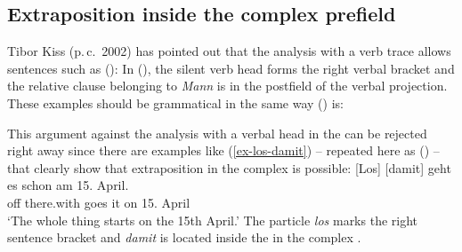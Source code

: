\subsection{Extraposition inside the complex prefield}
\label{sec-extraposition}

Tibor Kiss (p.\,c.\ 2002) has pointed out that the analysis with a verb trace allows sentences such as ():
\z
In (), the silent verb head forms the right verbal bracket and the relative clause belonging to \emph{Mann}
is in the postfield of the verbal projection. These examples should be grammatical in the same way () is:
\z

This argument against the analysis with a verbal head in the \vf can be rejected right away since
there are examples like (\ref{ex-los-damit}) -- repeated here as () -- that clearly show that extraposition in the complex \vf is possible:
\ea 
\gll {}[Los] [damit] geht es schon am 15. April.\footnotemark\\
	\spacebr{}off \spacebr{}there.with goes it \particle{} on 15. April\\
\glt `The whole thing starts on the 15th April.'
\z 
The particle \emph{los} marks the right sentence bracket and \emph{damit} is located inside the \nf
in the complex \vf.

